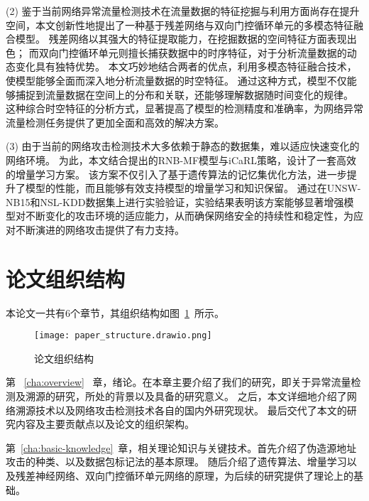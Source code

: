 (2) 鉴于当前网络异常流量检测技术在流量数据的特征挖掘与利用方面尚存在提升空间，本文创新性地提出了一种基于残差网络与双向门控循环单元的多模态特征融合模型。
残差网络以其强大的特征提取能力，在挖掘数据的空间特征方面表现出色；
而双向门控循环单元则擅长捕获数据中的时序特征，对于分析流量数据的动态变化具有独特优势。
本文巧妙地结合两者的优点，利用多模态特征融合技术，使模型能够全面而深入地分析流量数据的时空特征。
通过这种方式，模型不仅能够捕捉到流量数据在空间上的分布和关联，还能够理解数据随时间变化的规律。
这种综合时空特征的分析方式，显著提高了模型的检测精度和准确率，为网络异常流量检测任务提供了更加全面和高效的解决方案。\par

(3) 由于当前的网络攻击检测技术大多依赖于静态的数据集，难以适应快速变化的网络环境。
为此，本文结合提出的RNB-MF模型与iCaRL策略，设计了一套高效的增量学习方案。
该方案不仅引入了基于遗传算法的记忆集优化方法，进一步提升了模型的性能，而且能够有效支持模型的增量学习和知识保留。
通过在UNSW-NB15和NSL-KDD数据集上进行实验验证，实验结果表明该方案能够显著增强模型对不断变化的攻击环境的适应能力，从而确保网络安全的持续性和稳定性，为应对不断演进的网络攻击提供了有力支持。\par

\section{论文组织结构}
本论文一共有6个章节，其组织结构如图~\ref{fig:paper_structure}~所示。
\begin{figure}[htbp]
  \centering
  \texttt{[image: paper\_structure.drawio.png]}
  \caption{论文组织结构}
  \label{fig:paper_structure}
\end{figure}

第 ~\ref{cha:overview}~ 章，绪论。在本章主要介绍了我们的研究，即关于异常流量检测及溯源的研究，所处的背景以及具备的研究意义。
之后，本文详细地介绍了网络溯源技术以及网络攻击检测技术各自的国内外研究现状。
最后交代了本文的研究内容及主要贡献点以及论文的组织架构。


第~\ref{cha:basic-knowledge}~章，相关理论知识与关键技术。首先介绍了伪造源地址攻击的种类、以及数据包标记法的基本原理。
随后介绍了遗传算法、增量学习以及残差神经网络、双向门控循环单元网络的原理，为后续的研究提供了理论上的基础。


